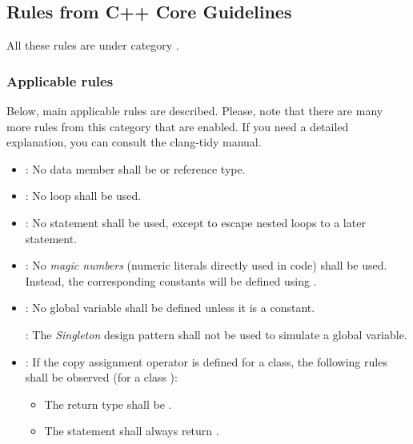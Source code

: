 \subsection{Rules from C++ Core Guidelines}

All these rules are under category
.

\subsubsection{Applicable rules}
Below, main applicable rules are described. Please, note that there are many
more rules from this category that are enabled. If you need a detailed
explanation, you can consult the clang-tidy manual.

\begin{itemize}

\item {}:
No data member shall be  or reference type.

\item {}:
No  loop shall be used.

\item {}:
No  statement shall be used,
except to escape nested loops to a later statement.

\item {}:
No \emph{magic numbers} (numeric literals directly used in code)
shall be used. Instead, the corresponding constants will be defined
using .

\item {}:
No global variable shall be defined unless it is a constant.

: The \emph{Singleton} design pattern shall not be used
to simulate a global variable.

\item {}:
If the copy assignment operator is defined for a class, the following
rules shall be observed (for a class ):
  \begin{itemize}
    \item The return type shall be .
    \item The  statement shall always return .
  \end{itemize}


\end{itemize}
